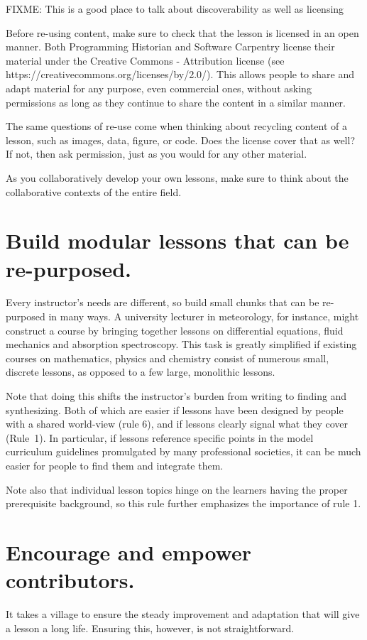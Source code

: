 \documentclass[10pt,letterpaper]{article}
\newcommand{\rulemajor}[1]{\section{#1}}
\begin{document}
FIXME: This is a good place to talk about discoverability as well as licensing

Before re-using content,
make sure to check that the lesson is licensed in an open manner.
Both Programming Historian and Software Carpentry license their material under
the Creative Commons - Attribution license
(see https://creativecommons.org/licenses/by/2.0/).
This allows people to share and adapt material for any purpose,
even commercial ones,
without asking permissions as long as they continue to share the content in a similar manner.

The same questions of re-use come when thinking about recycling content of a lesson,
such as images, data, figure, or code.
Does the license cover that as well?
If not,
then ask permission,
just as you would for any other material.

As you collaboratively develop your own lessons,
make sure to think about the collaborative contexts of the entire field.

\rulemajor{Build modular lessons that can be re-purposed.}

Every instructor's needs are different,
so build small chunks that can be re-purposed in many ways. 
A university lecturer in meteorology, for instance,
might construct a course by bringing together lessons on differential equations,
fluid mechanics and absorption spectroscopy. 
This task is greatly simplified if existing courses on mathematics, 
physics and chemistry consist of numerous small, discrete lessons,
as opposed to a few large, monolithic lessons.

Note that doing this shifts the instructor's burden from writing to finding and synthesizing.
Both of which are easier if lessons have been designed by people with a shared world-view (rule 6),
and if lessons clearly signal what they cover (Rule~1).
In particular,
if lessons reference specific points in the model curriculum guidelines promulgated by many professional societies,
it can be much easier for people to find them and integrate them.

Note also that individual lesson topics hinge on the learners having the proper prerequisite background,
so this rule further emphasizes the importance of rule 1.

\rulemajor{Encourage and empower contributors.}

It takes a village to ensure
the steady improvement and adaptation that will give a lesson a long life.
Ensuring this, however, is not straightforward.
\end{document}
